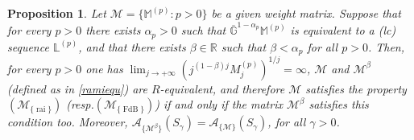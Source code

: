 \documentclass[11pt,a4paper]{article}
\theoremstyle{plain}
\newtheorem{proposition}{Proposition}[section]
\theoremstyle{definition}
\newcommand{\RR}{\mathbb{R}}
\newcommand{\M}{\mathbb{M}}
\newcommand{\LL}{\mathbb{L}}
\newcommand{\G}{\mathbb{G}}
\let\on=\operatorname
\begin{document}
%
%
\begin{proposition} Let $\mathcal{M}=\{\M^{(p)}: p>0\}$ be a given weight matrix. Suppose that {for every $p>0$ there exists  $\alpha_p>0$ such that $\overline{\G}^{1-\alpha_p}\M^{(p)}$ is equivalent to a (lc) sequence $\LL^{(p)}$, and that there exists $\beta\in\RR$ such that $\beta<\alpha_p$ for all $p>0$. Then, for every $p>0$ one has $\lim_{j\rightarrow+\infty}(j^{(1-\beta)j}M^{(p)}_j)^{1/j}=\infty$, $\mathcal{M}$ and $\mathcal{M}^{\beta}$ (defined as in \eqref{ramiequ}) are $R$-equivalent, and therefore $\mathcal{M}$ satisfies the property \hyperlink{R-rai}{$(\mathcal{M}_{\{\on{rai}\}})$} (resp.\hyperlink{R-FdB}{$(\mathcal{M}_{\{\on{FdB}\}})$}) if and only if the matrix $\mathcal{M}^{\beta}$ satisfies this condition too. Moreover, $\mathcal{A}_{\{\mathcal{M^{\text{$\beta$}}}\}}(S_{\gamma})= \mathcal{A}_{\{\mathcal{M}\}}(S_{\gamma})$, for all $\gamma>0$.}
\end{proposition}
\end{document}
